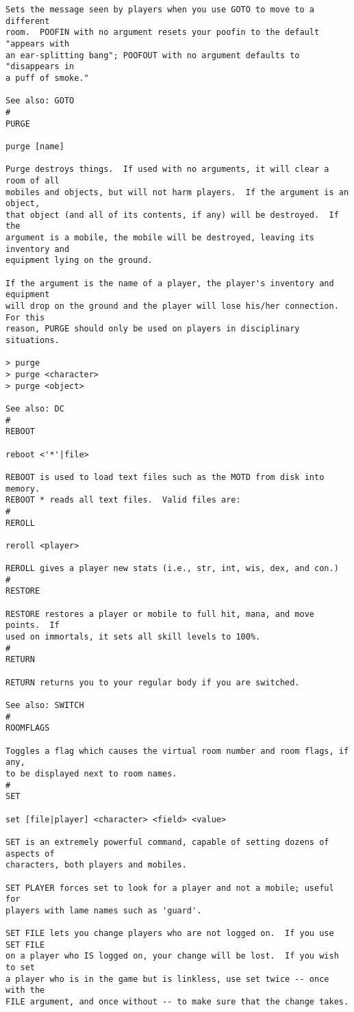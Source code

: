 \documentclass[11pt]{article}
\begin{document}
\begin{verbatim}
Sets the message seen by players when you use GOTO to move to a different
room.  POOFIN with no argument resets your poofin to the default "appears with
an ear-splitting bang"; POOFOUT with no argument defaults to "disappears in
a puff of smoke."

See also: GOTO
#
PURGE

purge [name]

Purge destroys things.  If used with no arguments, it will clear a room of all
mobiles and objects, but will not harm players.  If the argument is an object,
that object (and all of its contents, if any) will be destroyed.  If the
argument is a mobile, the mobile will be destroyed, leaving its inventory and
equipment lying on the ground.

If the argument is the name of a player, the player's inventory and equipment
will drop on the ground and the player will lose his/her connection.  For this
reason, PURGE should only be used on players in disciplinary situations.

> purge
> purge <character>
> purge <object>

See also: DC
#
REBOOT

reboot <'*'|file>

REBOOT is used to load text files such as the MOTD from disk into memory. 
REBOOT * reads all text files.  Valid files are:
#
REROLL

reroll <player>

REROLL gives a player new stats (i.e., str, int, wis, dex, and con.)
#
RESTORE

RESTORE restores a player or mobile to full hit, mana, and move points.  If
used on immortals, it sets all skill levels to 100%.
#
RETURN

RETURN returns you to your regular body if you are switched.

See also: SWITCH
#
ROOMFLAGS

Toggles a flag which causes the virtual room number and room flags, if any,
to be displayed next to room names.
#
SET

set [file|player] <character> <field> <value>

SET is an extremely powerful command, capable of setting dozens of aspects of
characters, both players and mobiles.

SET PLAYER forces set to look for a player and not a mobile; useful for
players with lame names such as 'guard'.

SET FILE lets you change players who are not logged on.  If you use SET FILE
on a player who IS logged on, your change will be lost.  If you wish to set
a player who is in the game but is linkless, use set twice -- once with the
FILE argument, and once without -- to make sure that the change takes.


\end{verbatim}
\end{document}
